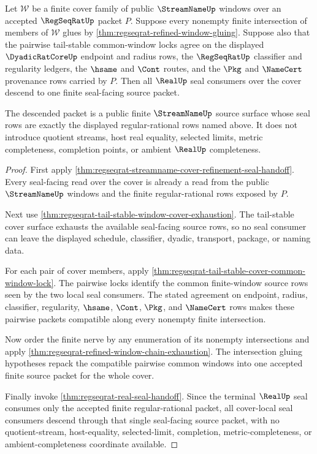 \begin{theorem}
\label{thm:regseqrat-finite-cover-nerve-descent}
Let $\mathcal W$ be a finite cover family of public $\StreamNameUp$ windows
over an accepted $\RegSeqRatUp$ packet $P$. Suppose every nonempty finite
intersection of members of $\mathcal W$ glues by
\autoref{thm:regseqrat-refined-window-gluing}. Suppose also that the
pairwise tail-stable common-window locks agree on the displayed
$\DyadicRatCoreUp$ endpoint and radius rows, the $\RegSeqRatUp$ classifier
and regularity ledgers, the $\hsame$ and $\Cont$ routes, and the $\Pkg$ and
$\NameCert$ provenance rows carried by $P$. Then all $\RealUp$ seal consumers
over the cover descend to one finite seal-facing source packet.

The descended packet is a public finite $\StreamNameUp$ source surface whose
seal rows are exactly the displayed regular-rational rows named above. It
does not introduce quotient streams, host real equality, selected limits,
metric completeness, completion points, or ambient $\RealUp$ completeness.
\end{theorem}
\begin{proof}
First apply
\autoref{thm:regseqrat-streamname-cover-refinement-seal-handoff}. Every
seal-facing read over the cover is already a read from the public
$\StreamNameUp$ windows and the finite regular-rational rows exposed by $P$.

Next use \autoref{thm:regseqrat-tail-stable-window-cover-exhaustion}. The
tail-stable cover surface exhausts the available seal-facing source rows, so
no seal consumer can leave the displayed schedule, classifier, dyadic,
transport, package, or naming data.

For each pair of cover members, apply
\autoref{thm:regseqrat-tail-stable-cover-common-window-lock}. The pairwise
locks identify the common finite-window source rows seen by the two local
seal consumers. The stated agreement on endpoint, radius, classifier,
regularity, $\hsame$, $\Cont$, $\Pkg$, and $\NameCert$ rows makes these
pairwise packets compatible along every nonempty finite intersection.

Now order the finite nerve by any enumeration of its nonempty intersections
and apply \autoref{thm:regseqrat-refined-window-chain-exhaustion}. The
intersection gluing hypotheses repack the compatible pairwise common windows
into one accepted finite source packet for the whole cover.

Finally invoke \autoref{thm:regseqrat-real-seal-handoff}. Since the terminal
$\RealUp$ seal consumes only the accepted finite regular-rational packet, all
cover-local seal consumers descend through that single seal-facing source
packet, with no quotient-stream, host-equality, selected-limit, completion,
metric-completeness, or ambient-completeness coordinate available.
\end{proof}

